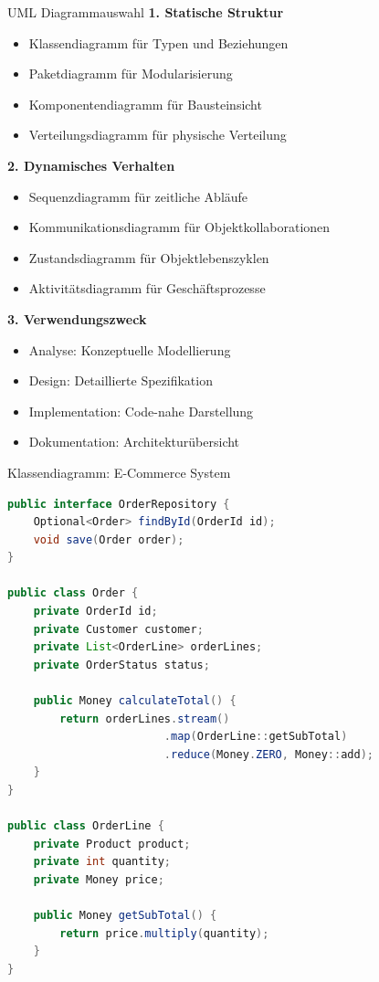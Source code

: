 \begin{KR}{UML Diagrammauswahl}
\textbf{1. Statische Struktur}
\begin{itemize}
    \item Klassendiagramm für Typen und Beziehungen
    \item Paketdiagramm für Modularisierung
    \item Komponentendiagramm für Bausteinsicht
    \item Verteilungsdiagramm für physische Verteilung
\end{itemize}

\textbf{2. Dynamisches Verhalten}
\begin{itemize}
    \item Sequenzdiagramm für zeitliche Abläufe
    \item Kommunikationsdiagramm für Objektkollaborationen
    \item Zustandsdiagramm für Objektlebenszyklen
    \item Aktivitätsdiagramm für Geschäftsprozesse
\end{itemize}

\textbf{3. Verwendungszweck}
\begin{itemize}
    \item Analyse: Konzeptuelle Modellierung
    \item Design: Detaillierte Spezifikation
    \item Implementation: Code-nahe Darstellung
    \item Dokumentation: Architekturübersicht
\end{itemize}
\end{KR}

\begin{example2}{Klassendiagramm: E-Commerce System}
\begin{lstlisting}[language=Java, style=basesmol]
public interface OrderRepository {
    Optional<Order> findById(OrderId id);
    void save(Order order);
}

public class Order {
    private OrderId id;
    private Customer customer;
    private List<OrderLine> orderLines;
    private OrderStatus status;
    
    public Money calculateTotal() {
        return orderLines.stream()
                        .map(OrderLine::getSubTotal)
                        .reduce(Money.ZERO, Money::add);
    }
}

public class OrderLine {
    private Product product;
    private int quantity;
    private Money price;
    
    public Money getSubTotal() {
        return price.multiply(quantity);
    }
}
\end{lstlisting}
\end{example2}


